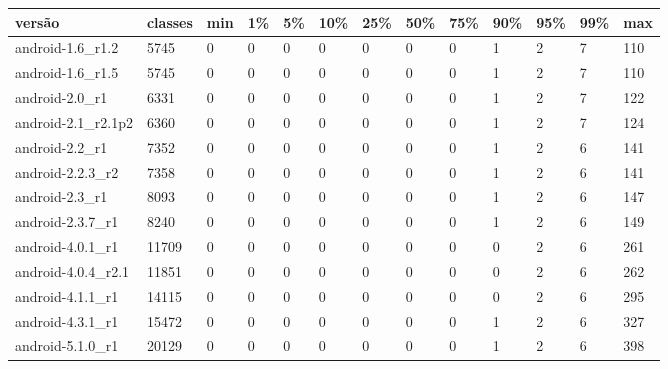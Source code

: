 \begin{tabular}{|l|l|l|l|l|l|l|l|l|l|l|l|l|}
\hline
versão&classes&min&1\%&5\%&10\%&25\%&50\%&75\%&90\%&95\%&99\%&max\\
\hline
android-1.6\_r1.2&5745&0&0&0&0&0&0&0&1&2&7&110\\
\hline
android-1.6\_r1.5&5745&0&0&0&0&0&0&0&1&2&7&110\\
\hline
android-2.0\_r1&6331&0&0&0&0&0&0&0&1&2&7&122\\
\hline
android-2.1\_r2.1p2&6360&0&0&0&0&0&0&0&1&2&7&124\\
\hline
android-2.2\_r1&7352&0&0&0&0&0&0&0&1&2&6&141\\
\hline
android-2.2.3\_r2&7358&0&0&0&0&0&0&0&1&2&6&141\\
\hline
android-2.3\_r1&8093&0&0&0&0&0&0&0&1&2&6&147\\
\hline
android-2.3.7\_r1&8240&0&0&0&0&0&0&0&1&2&6&149\\
\hline
android-4.0.1\_r1&11709&0&0&0&0&0&0&0&0&2&6&261\\
\hline
android-4.0.4\_r2.1&11851&0&0&0&0&0&0&0&0&2&6&262\\
\hline
android-4.1.1\_r1&14115&0&0&0&0&0&0&0&0&2&6&295\\
\hline
android-4.3.1\_r1&15472&0&0&0&0&0&0&0&1&2&6&327\\
\hline
android-5.1.0\_r1&20129&0&0&0&0&0&0&0&1&2&6&398\\
\hline
\end{tabular}
